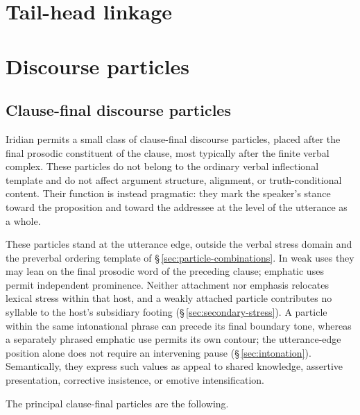 \section{Tail-head linkage}\label{sec:tail-head}


\section{Discourse particles}\label{sec:discourse-particles}\label{sec:discourse-word-order}


\subsection{Clause-final discourse particles}\label{sec:disc-final-particles}

Iridian permits a small class of clause-final discourse particles, placed after
the final prosodic constituent of the clause, most typically after the finite
verbal complex. These particles do not belong to the ordinary verbal
inflectional template and do not affect argument structure, alignment, or
truth-conditional content. Their function is instead pragmatic: they mark the
speaker's stance toward the proposition and toward the addressee at the level of
the utterance as a whole.

These particles stand at the utterance edge, outside the verbal stress domain
and the preverbal ordering template of §\,\ref{sec:particle-combinations}.
In weak uses they may lean on the final prosodic word of the preceding clause;
emphatic uses permit independent prominence. Neither attachment nor emphasis
relocates lexical stress within that host, and a weakly attached particle
contributes no syllable to the host's subsidiary footing
(§\,\ref{sec:secondary-stress}). A particle within the same intonational
phrase can precede its final boundary tone, whereas a separately phrased
emphatic use permits its own contour; the utterance-edge position alone does
not require an intervening pause (§\,\ref{sec:intonation}). Semantically, they express such
values as appeal to shared knowledge, assertive presentation, corrective
insistence, or emotive intensification.

The principal clause-final particles are the following.

